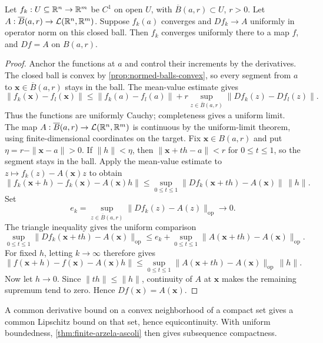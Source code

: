 \begin{proposition}\label{prop:differentiate-map-limits}
Let $f_k:U\subseteq\mathbb{R}^n\to\mathbb{R}^m$ be $C^1$ on open $U$, with
$\overline B(a,r)\subset U$, $r>0$. Let
$A:\overline B(a,r)\to\mathcal L(\mathbb{R}^n,\mathbb{R}^m)$. Suppose $f_k(a)$ converges and
$Df_k\to A$ uniformly in operator norm on this closed ball. Then $f_k$
converges uniformly there to a map $f$, and $Df=A$ on $B(a,r)$.
\end{proposition}
\begin{proof}
Anchor the functions at $a$ and control their increments by the derivatives.
The closed ball is convex by \cref{prop:normed-balls-convex}, so every segment
from $a$ to $\mathbf{x}\in\overline B(a,r)$ stays in the ball. The mean-value estimate gives
\[
\|f_k(\mathbf{x})-f_l(\mathbf{x})\|\leq\|f_k(a)-f_l(a)\|
+r\sup_{z\in\overline B(a,r)}\|Df_k(z)-Df_l(z)\|.
\]
Thus the functions are uniformly Cauchy; completeness gives a uniform limit.
The map $A:\overline B(a,r)\to\mathcal L(\mathbb{R}^n,\mathbb{R}^m)$ is continuous by
the uniform-limit theorem, using finite-dimensional coordinates on the target.
Fix $\mathbf{x}\in B(a,r)$ and put $\eta=r-\|\mathbf{x}-a\|>0$. If $\|h\|<\eta$, then
$\|\mathbf{x}+th-a\|<r$ for $0\leq t\leq1$, so the segment stays in the ball. Apply
the mean-value estimate to $z\mapsto f_k(z)-A(\mathbf{x})z$ to obtain
\[
\|f_k(\mathbf{x}+h)-f_k(\mathbf{x})-A(\mathbf{x})h\|
\leq\sup_{0\leq t\leq1}\|Df_k(\mathbf{x}+th)-A(\mathbf{x})\|\,\|h\|.
\]
Set
\[
e_k=\sup_{z\in\overline B(a,r)}\|Df_k(z)-A(z)\|_{\mathrm{op}}
\longrightarrow0.
\]
The triangle inequality gives the uniform comparison
\[
\sup_{0\leq t\leq1}\|Df_k(\mathbf{x}+th)-A(\mathbf{x})\|_{\mathrm{op}}
\leq e_k+\sup_{0\leq t\leq1}\|A(\mathbf{x}+th)-A(\mathbf{x})\|_{\mathrm{op}}.
\]
For fixed $h$, letting $k\to\infty$ therefore gives
\[
\|f(\mathbf{x}+h)-f(\mathbf{x})-A(\mathbf{x})h\|
\leq\sup_{0\leq t\leq1}\|A(\mathbf{x}+th)-A(\mathbf{x})\|_{\mathrm{op}}\,\|h\|.
\]
Now let $h\to0$. Since $\|th\|\leq\|h\|$, continuity of $A$ at $\mathbf{x}$
makes the remaining supremum tend to zero. Hence $Df(\mathbf{x})=A(\mathbf{x})$.
\end{proof}
A common derivative bound on a convex neighborhood of a compact set gives
a common Lipschitz bound on that set, hence equicontinuity. With uniform
boundedness, \cref{thm:finite-arzela-ascoli} then gives subsequence compactness.


